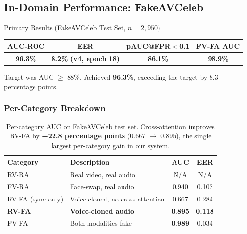 \documentclass[12pt, letterpaper]{article}
\begin{document}
\subsection{In-Domain Performance: FakeAVCeleb}

\begin{resultbox}{Primary Results (FakeAVCeleb Test Set, $n = 2{,}950$)}
\begin{center}
\renewcommand{\arraystretch}{1.4}
\begin{tabular}{cccc}
\textbf{AUC-ROC} & \textbf{EER} & \textbf{pAUC@FPR$<$0.1} & \textbf{FV-FA AUC} \\
\midrule
\textbf{96.3\%} & \textbf{8.2\% (v4, epoch 18)} & \textbf{86.1\%} & \textbf{98.9\%} \\
\end{tabular}
\renewcommand{\arraystretch}{1.0}
\end{center}
Target was AUC $\geq$ 88\%. Achieved \textbf{96.3\%}, exceeding the target by 8.3 percentage points.
\end{resultbox}

\subsubsection{Per-Category Breakdown}

\renewcommand{\arraystretch}{1.5}
\begin{table}[H]
\centering
\begin{tabular}{@{} l l c c @{}}
\toprule
\textbf{Category} & \textbf{Description} & \textbf{AUC} & \textbf{EER} \\
\midrule
RV-RA & Real video, real audio & N/A & N/A \\
FV-RA & Face-swap, real audio & 0.940 & 0.103 \\
RV-FA (sync-only) & Voice-cloned, no cross-attention & 0.667 & 0.284 \\
\textbf{RV-FA} & \textbf{Voice-cloned audio} & \textbf{0.895} & \textbf{0.118} \\
FV-FA & Both modalities fake & \textbf{0.989} & 0.034 \\
\bottomrule
\end{tabular}
\caption{Per-category AUC on FakeAVCeleb test set. Cross-attention improves RV-FA by \textbf{+22.8 percentage points} (0.667 $\to$ 0.895), the single largest per-category gain in our system.}
\end{table}
\renewcommand{\arraystretch}{1.0}
\end{document}
